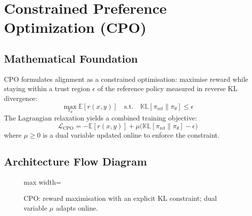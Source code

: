 \newpage
\section{Constrained Preference Optimization (CPO)}

\subsection{Mathematical Foundation}
CPO formulates alignment as a constrained optimisation: maximise reward while staying within a trust region $\epsilon$ of the reference policy measured in reverse KL divergence:
\begin{equation}
  \max_{\pi_\theta} \mathbb{E}[r(x,y)] \quad \text{s.t.} \quad \mathbb{KL}[\pi_{\text{ref}} \| \pi_\theta] \leq \epsilon
\end{equation}
The Lagrangian relaxation yields a combined training objective:
\begin{equation}
  \mathcal{L}_{\text{CPO}} = -\mathbb{E}[r(x,y)] + \mu\bigl(\mathbb{KL}[\pi_{\text{ref}} \| \pi_\theta] - \epsilon\bigr)
\end{equation}
where $\mu \geq 0$ is a dual variable updated online to enforce the constraint.

\subsection{Architecture Flow Diagram}

\begin{figure}[h]
\centering
\begin{adjustbox}{max width=\linewidth}
\end{adjustbox}
\caption{CPO: reward maximisation with an explicit KL constraint; dual variable $\mu$ adapts online.}
\end{figure}

